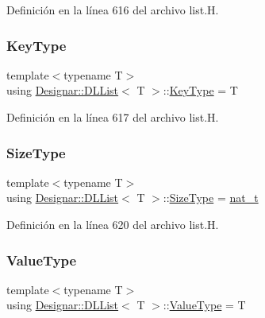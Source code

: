 Definición en la línea 616 del archivo list.\+H.

\mbox{\label{class_designar_1_1_d_l_list_ac27702ab24c52fa9d770abc3c455bb25}} 
\subsubsection{\texorpdfstring{Key\+Type}{KeyType}}
{\footnotesize\ttfamily template$<$typename T$>$ \\
using \hyperlink{class_designar_1_1_d_l_list}{Designar\+::\+D\+L\+List}$<$ T $>$\+::\hyperlink{class_designar_1_1_d_l_list_ac27702ab24c52fa9d770abc3c455bb25}{Key\+Type} =  T}



Definición en la línea 617 del archivo list.\+H.

\mbox{\label{class_designar_1_1_d_l_list_ac03520f15d4db4a31f8764ed5633e0c6}} 
\subsubsection{\texorpdfstring{Size\+Type}{SizeType}}
{\footnotesize\ttfamily template$<$typename T$>$ \\
using \hyperlink{class_designar_1_1_d_l_list}{Designar\+::\+D\+L\+List}$<$ T $>$\+::\hyperlink{class_designar_1_1_d_l_list_ac03520f15d4db4a31f8764ed5633e0c6}{Size\+Type} =  \hyperlink{namespace_designar_aa72662848b9f4815e7bf31a7cf3e33d1}{nat\+\_\+t}}



Definición en la línea 620 del archivo list.\+H.

\mbox{\label{class_designar_1_1_d_l_list_a839e4da136d61d24ba8f14fb4d9ceb34}} 
\subsubsection{\texorpdfstring{Value\+Type}{ValueType}}
{\footnotesize\ttfamily template$<$typename T$>$ \\
using \hyperlink{class_designar_1_1_d_l_list}{Designar\+::\+D\+L\+List}$<$ T $>$\+::\hyperlink{class_designar_1_1_d_l_list_a839e4da136d61d24ba8f14fb4d9ceb34}{Value\+Type} =  T}



